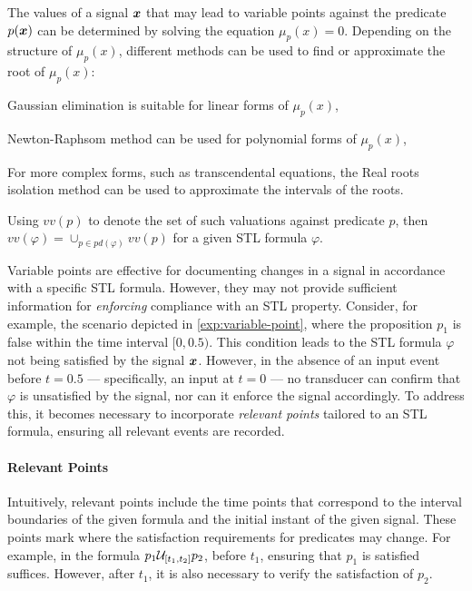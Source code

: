         The values of a signal \(\bm{x}\) that may lead to variable points against the predicate \(p(\bm{x})\) can be determined by solving the equation \(\mu_p(x)=0\). Depending on the structure of $\mu_p(x)$, different methods can be used to find or approximate the root of $\mu_p(x)$:
        \begin{enumerate*}[label=(\roman*)]
            \item Gaussian elimination is suitable for linear forms of $\mu_p(x)$,
            \item Newton-Raphsom method can be used for polynomial forms of $\mu_p(x)$,
            \item For more complex forms, such as transcendental equations, the Real roots isolation method \cite{gan2017reachability} can be used to approximate the intervals of the roots.
        \end{enumerate*}
        Using $vv(p)$ to denote the set of such valuations against predicate $p$, then $vv(\varphi) = \cup_{p\in pd(\varphi)}vv(p)$ for a given STL formula $\varphi$.  
        
        Variable points are effective for documenting changes in a signal in accordance with a specific STL formula. However, they may not provide sufficient information for \emph{enforcing} compliance with an STL property.
        Consider, for example, the scenario depicted in \cref{exp:variable-point}, where the proposition $p_1$ is false within the time interval $[0,0.5)$. This condition leads to the STL formula $\varphi$ not being satisfied by the signal $\bm{x}$. However, in the absence of an input event before $t=0.5$ — specifically, an input at $t=0$ — no transducer can confirm that $\varphi$ is unsatisfied by the signal, nor can it enforce the signal accordingly.
        To address this, it becomes necessary to incorporate \emph{relevant points} tailored to an STL formula, ensuring all relevant events are recorded. %

        
        \paragraph{Relevant Points} Intuitively, relevant points include the time points that correspond to the interval boundaries of the given formula and the initial instant of the given signal. These points mark where the satisfaction requirements for predicates may change. For example, in the formula \( p_1 \until_{[t_1,t_2]} p_2 \), before \(t_1\), ensuring that \(p_1\) is satisfied suffices. However, after \(t_1\), it is also necessary to verify the satisfaction of \(p_2\).
        
